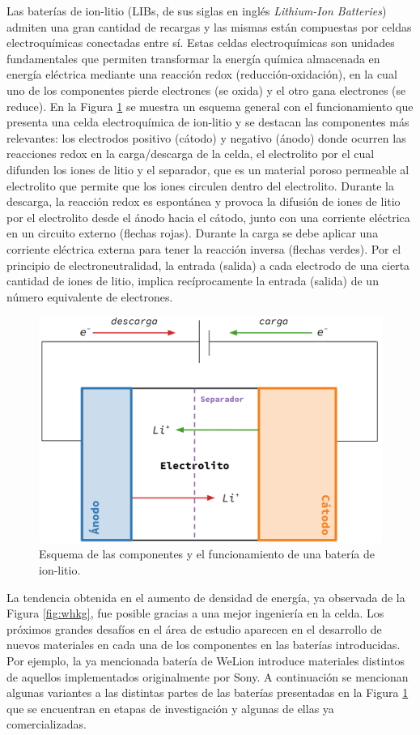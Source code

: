 Las baterías de ion-litio (LIBs, de sus siglas en inglés \textit{Lithium-Ion 
Batteries}) admiten una gran cantidad de recargas y las mismas están compuestas 
por celdas electroquímicas conectadas entre sí. Estas celdas electroquímicas son unidades 
fundamentales que permiten transformar la energía química almacenada en energía
eléctrica mediante una reacción redox (reducción-oxidación), en la cual uno de los 
componentes pierde electrones (se oxida) y el otro gana electrones (se reduce).
En la Figura \ref{fig:esquema-bateria} se muestra un esquema general con el 
funcionamiento que presenta una celda electroquímica de ion-litio y se destacan 
las componentes más relevantes: los electrodos positivo (cátodo) y negativo (ánodo) 
donde ocurren las reacciones redox en la carga/descarga de la celda, el electrolito 
por el cual difunden los iones de litio y el separador, que es un material 
poroso permeable al electrolito que permite que los iones circulen dentro del electrolito.
Durante la descarga, la reacción redox es espontánea y 
provoca la difusión de iones de litio por el electrolito desde el ánodo hacia el 
cátodo, junto con una corriente eléctrica en un circuito externo (flechas rojas). 
Durante la carga se debe aplicar una corriente eléctrica externa para tener la 
reacción inversa (flechas verdes).
Por el principio de electroneutralidad, la entrada (salida) a cada electrodo de una cierta cantidad de iones de litio, implica recíprocamente la entrada (salida) de un número equivalente de electrones.
\begin{figure}[h!]
    \centering
    \includegraphics[width=.8\textwidth]{Introduccion/baterias/esquema_bateria.png}
    \caption{Esquema de las componentes y el funcionamiento de una batería de 
    ion-litio.}
    \label{fig:esquema-bateria}
\end{figure}

La tendencia obtenida en el aumento de densidad de energía, ya observada de la 
Figura \ref{fig:whkg}, fue posible gracias a una mejor ingeniería en la celda. 
Los próximos grandes desafíos en el área de estudio aparecen en el desarrollo de 
nuevos materiales en cada una de los componentes en las baterías introducidas.
Por ejemplo, la ya mencionada batería de WeLion introduce materiales distintos 
de aquellos implementados originalmente por Sony. A continuación se mencionan
algunas variantes a las distintas partes de las baterías presentadas en la
Figura \ref{fig:esquema-bateria} que se encuentran en etapas de investigación 
y algunas de ellas ya comercializadas.

